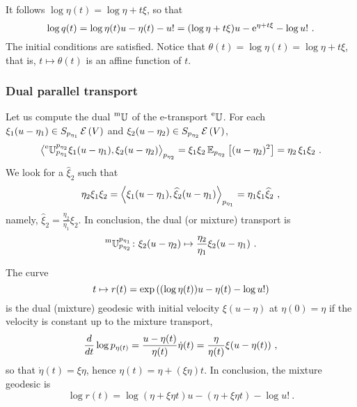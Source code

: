 \documentclass[12pt,a4paper]{amsart}
\begin{document}
It follows $\log \eta(t) = \log \eta + t \xi$, so that
\begin{equation}
  \label{eq:17}
  \log q(t) = \log \eta(t)u - \eta(t) - u! = (\log \eta + t \xi) u - \euler^{\eta + t \xi} - \log u! \ . 
\end{equation}
The initial conditions are satisfied. Notice that $\theta(t) = \log \eta(t) = \log \eta + t \xi$, that is, $t \mapsto \theta(t)$ is an affine function of $t$.

\subsubsection{Dual parallel transport}
Let us compute the dual $\prescript{\text{m}}{} {\mathbb U} _ {} ^ {}$ of the e-transport $\prescript{\text{e}}{} {\mathbb U} _ {} ^ {}$. For each $\xi_1(u - \eta_1) \in S_{p_{\eta_1}}\operatorname{\mathcal E}\left(V\right)$ and $\xi_2(u - \eta_2) \in S_{p_{\eta_2}}\operatorname{\mathcal E}\left(V\right)$,
\begin{equation}
  \label{eq:4}
  \scalarat {p_{\eta_2}} {\etransport {p_{\eta_1}}{p_{\eta_2}} \xi_1(u - \eta_1)} {\xi_2(u - \eta_2)} = \xi_1 \xi_2 \expectat {p_{\eta_2}} {(u - \eta_2)^2} =  \eta_2\,\xi_1 \xi_2 \ .
\end{equation}
We look for a $\widehat{\xi}_2$ such that
\begin{equation}
  \label{eq:7}
   \eta_2 \xi_1\xi_2 = \scalarat {p_{\eta_1}} {\xi_1(u - \eta_1)}{\widehat{\xi}_2(u - \eta_1)} = \eta_1 \xi_1 \widehat{\xi}_2 \ ,
\end{equation}
namely, $\widehat{\xi}_2 = \frac {\eta_2}{\eta_1} \xi_2$. In conclusion, the dual (or mixture) transport is
\begin{equation}
  \label{eq:18}
  \mtransport {p_{\eta_2}}{p_{\eta_1}} \colon \xi_2(u - \eta_2) \mapsto \frac {\eta_2}{\eta_1} \xi_2 (u - \eta_1) \ .
\end{equation}

The curve
\begin{equation}
    t \mapsto r(t) = \exp\left((\log \eta(t))u - \eta(t) - \log u!\right)
\end{equation}
is the dual (mixture) geodesic with initial velocity $\xi (u - \eta)$ at $\eta(0) = \eta$ if the velocity is constant up to the mixture transport,
\begin{equation}
  \label{eq:19}
  \derivby t \log p_{\eta(t)} = \frac {u - \eta(t)} {\eta(t)} \dot \eta(t)=  \frac \eta {\eta(t)}\xi (u - \eta(t)) \ ,  
\end{equation}
so that $\dot \eta(t) = \xi \eta$, hence $\eta(t) = \eta + (\xi \eta) t$. In conclusion, the mixture geodesic is
\begin{equation}
  \label{eq:23}
  \log r(t) = \log (\eta + \xi \eta t)u - (\eta + \xi \eta t) - \log u! \ .
\end{equation}
\end{document}

